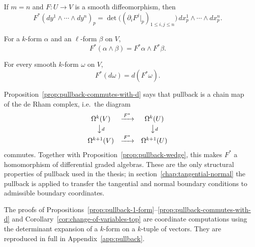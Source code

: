 \begin{corollary}
\label{cor:change-of-variables-top}
If $m=n$ and $F:U\to V$ is a smooth diffeomorphism, then
\[
    F^*(dy^1\wedge\cdots\wedge dy^n)_p
    =
    \det\bigl((\partial_i F^j|_p)_{1\le i,j\le n}\bigr)\,
    dx^1_p\wedge\cdots\wedge dx^n_p .
\]
\end{corollary}

\begin{proposition}
\label{prop:pullback-wedge}
For a $k$-form $\alpha$ and an $\ell$-form $\beta$ on $V$,
\[
    F^*(\alpha\wedge\beta) = F^*\alpha\wedge F^*\beta .
\]
\end{proposition}

\begin{proposition}
\label{prop:pullback-commutes-with-d}
For every smooth $k$-form $\omega$ on $V$,
\[
    F^*(d\omega) = d(F^*\omega).
\]
\end{proposition}

\begin{remark}
\label{rem:pullback-chain-map}
Proposition~\ref{prop:pullback-commutes-with-d} says that pullback is a
chain map of the de Rham complex, i.e.\ the diagram
\[
    \begin{array}{ccc}
        \Omega^k(V) & \xrightarrow{\,F^*\,} & \Omega^k(U) \\[2pt]
        \big\downarrow{\scriptstyle d} & & \big\downarrow{\scriptstyle d} \\[2pt]
        \Omega^{k+1}(V) & \xrightarrow{\,F^*\,} & \Omega^{k+1}(U)
    \end{array}
\]
commutes. Together with Proposition~\ref{prop:pullback-wedge}, this makes
$F^*$ a homomorphism of differential graded algebras. These are the only
structural properties of pullback used in the thesis; in
section~\ref{chap:tangential-normal} the pullback is applied to transfer the
tangential and normal boundary conditions to admissible boundary
coordinates.
\end{remark}

The proofs of Propositions~\ref{prop:pullback-1-form}--\ref{prop:pullback-commutes-with-d}
and Corollary~\ref{cor:change-of-variables-top} are coordinate
computations using the determinant expansion of a $k$-form on a
$k$-tuple of vectors. They are reproduced in full in
Appendix~\ref{app:pullback}.

